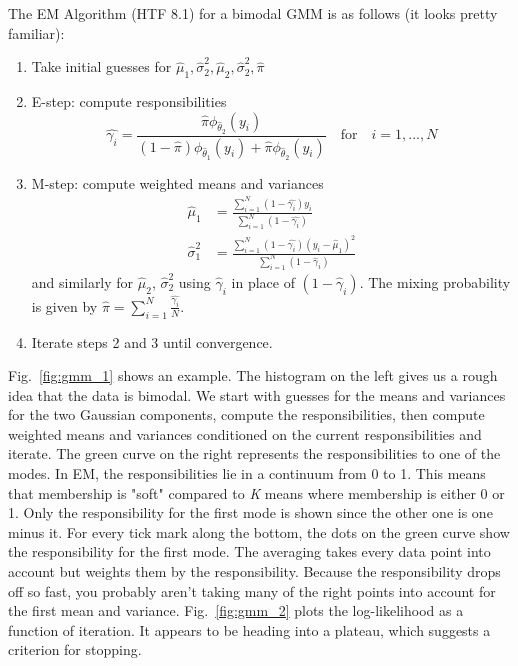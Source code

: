 \documentclass[a4paper]{article}
\begin{document}
The EM Algorithm (HTF 8.1) for a bimodal GMM is as follows (it looks pretty familiar):
\begin{enumerate}
\item Take initial guesses for $\hat{\mu}_1,\hat{\sigma}_2^2,\hat{\mu}_2,\hat{\sigma}_2^2,\hat{\pi}$
\item E-step: compute responsibilities \\
$$
\hat{\gamma_i} = \frac{\hat{\pi}\phi_{\hat{\theta}_2}(y_i)}{(1-\hat{\pi}) \phi_{\hat{\theta}_1}(y_i) + \hat{\pi} \phi_{\hat{\theta}_2}(y_i)} \quad \text{for} \quad i=1,...,N
$$
\item M-step: compute weighted means and variances
\begin{align*}
\hat{\mu}_1 &= \frac{\sum_{i=1}^{N} (1-\hat{\gamma_i})y_i}{\sum_{i=1}^{N} (1-\hat{\gamma_i})}  \\
\hat{\sigma}_1^2 &= \frac{\sum_{i=1}^{N} (1-\hat{\gamma_i})(y_i-\hat{\mu}_1)^2}{\sum_{i=1}^{N} (1-\hat{\gamma}_i)}
\end{align*}
and similarly for $\hat{\mu}_2$, $\hat{\sigma}^2_2$ using $\hat{\gamma}_i$ in place of $(1-\hat{\gamma}_i)$.  The mixing probability is given by $\hat{\pi} = \sum_{i=1}^{N} \frac{\hat{\gamma_i}}{N}$.

\item Iterate steps 2 and 3 until convergence.

\end{enumerate}

Fig.\ \ref{fig:gmm_1} shows an example.  
The histogram on the left gives us a rough idea that the data is bimodal.  
We start  with guesses for the means and variances for the two Gaussian components, compute the responsibilities, then compute weighted means and variances conditioned on the current responsibilities and iterate.  
The green curve on the right represents the responsibilities to one of the modes.  
In EM, the responsibilities lie in a continuum from 0 to 1.  This means that membership is "soft" compared to \emph{K} means where membership is either 0 or 1.
Only the responsibility for the first mode is shown since the other one is one minus it.  
For every tick mark along the bottom, the dots on the green curve show the responsibility for the first mode.  
The averaging takes every data point into account but weights them by the responsibility.  
Because the responsibility drops off so fast, you probably aren't taking many of the right points into account for the first mean and variance.
Fig.\ \ref{fig:gmm_2} plots the log-likelihood as a function of iteration.  
It appears to be heading into a plateau, which suggests a criterion for stopping.
\end{document}
